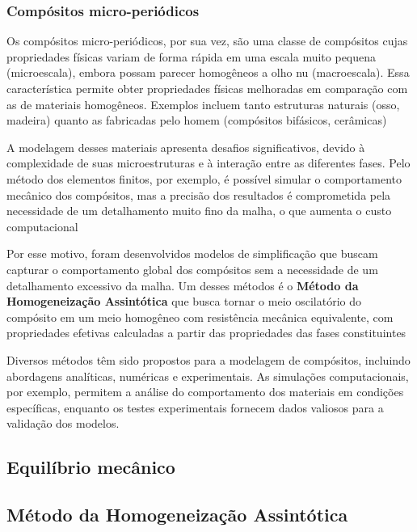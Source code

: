 \subsubsection{Compósitos micro-periódicos}

Os compósitos micro-periódicos, por sua vez, são uma classe de compósitos cujas propriedades físicas variam de forma rápida em uma escala muito pequena (microescala), 
embora possam parecer homogêneos a olho nu (macroescala). 
Essa característica permite obter propriedades físicas melhoradas em comparação com as de materiais homogêneos. 
Exemplos incluem tanto estruturas naturais (osso, madeira) quanto as fabricadas pelo homem (compósitos bifásicos, cerâmicas)

A modelagem desses materiais apresenta desafios significativos, devido à complexidade de suas microestruturas e à interação entre as diferentes fases.
Pelo método dos elementos finitos, por exemplo, é possível simular o comportamento mecânico dos compósitos,
mas a precisão dos resultados é comprometida pela necessidade de um detalhamento muito fino da malha, o que aumenta o custo computacional %

Por esse motivo, foram desenvolvidos modelos de simplificação que buscam capturar o comportamento global dos compósitos sem a necessidade de um detalhamento excessivo da malha.
Um desses métodos é o \textbf{Método da Homogeneização Assintótica} que busca tornar o meio oscilatório do compósito em um meio homogêneo com resistência mecânica equivalente,
 com propriedades efetivas calculadas a partir das propriedades das fases constituintes %


Diversos métodos têm sido propostos para a modelagem de compósitos, incluindo abordagens analíticas, numéricas e experimentais. As simulações computacionais, por exemplo, permitem a análise do comportamento dos materiais em condições específicas, enquanto os testes experimentais fornecem dados valiosos para a validação dos modelos.

\subsection{Equilíbrio mecânico}


\subsection{Método da Homogeneização Assintótica}

